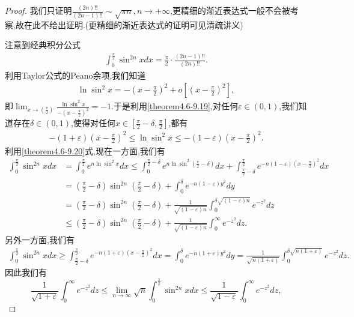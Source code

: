 \documentclass[lang=cn,newtx,10pt,scheme=chinese]{elegantbook}
\begin{document}
\begin{proof}
我们只证明$\frac{(2n)!!}{(2n-1)!!}\sim \sqrt{\pi n},n\rightarrow +\infty$,更精细的渐近表达式一般不会被考察,故在此不给出证明.(更精细的渐近表达式的证明可见清疏讲义)

注意到经典积分公式
\begin{align}\label{theorem4.6-1.1}
\int_{0}^{\frac{\pi}{2}}\sin^{2n}x dx=\frac{\pi}{2}\cdot\frac{(2n - 1)!!}{(2n)!!}.
\end{align}
利用Taylor公式的Peano余项,我们知道
\begin{align}\label{theorem4.6-9.19}
\ln\sin^{2}x=-\left(x - \frac{\pi}{2}\right)^{2}+o\left[\left(x - \frac{\pi}{2}\right)^{2}\right],
\end{align}
即\(\lim_{x\rightarrow(\frac{\pi}{2})}\frac{\ln\sin^{2}x}{-(x - \frac{\pi}{2})^{2}}=-1\).于是利用\eqref{theorem4.6-9.19},对任何\(\varepsilon\in(0,1)\),我们知道存在\(\delta\in(0,1)\),使得对任何\(x\in[\frac{\pi}{2}-\delta,\frac{\pi}{2}]\),都有
\begin{align}\label{theorem4.6-9.20}
-(1 + \varepsilon)\left(x - \frac{\pi}{2}\right)^{2}\leqslant\ln\sin^{2}x\leqslant-(1 - \varepsilon)\left(x - \frac{\pi}{2}\right)^{2}.
\end{align}
利用\eqref{theorem4.6-9.20}式,现在一方面,我们有
\begin{align*}
\int_{0}^{\frac{\pi}{2}}\sin^{2n}x dx&=\int_{0}^{\frac{\pi}{2}}e^{n\ln\sin^{2}x}dx
\leqslant\int_{0}^{\frac{\pi}{2}-\delta}e^{n\ln\sin^{2}(\frac{\pi}{2}-\delta)}dx+\int_{\frac{\pi}{2}-\delta}^{\frac{\pi}{2}}e^{-n(1 - \varepsilon)(x - \frac{\pi}{2})^{2}}dx\\
&=(\frac{\pi}{2}-\delta)\sin^{2n}(\frac{\pi}{2}-\delta)+\int_{0}^{\delta}e^{-n(1 - \varepsilon)y^{2}}dy\\
&=(\frac{\pi}{2}-\delta)\sin^{2n}(\frac{\pi}{2}-\delta)+\frac{1}{\sqrt{(1 - \varepsilon)n}}\int_{0}^{\delta\sqrt{(1 - \varepsilon)n}}e^{-z^{2}}dz\\
&\leqslant(\frac{\pi}{2}-\delta)\sin^{2n}(\frac{\pi}{2}-\delta)+\frac{1}{\sqrt{(1 - \varepsilon)n}}\int_{0}^{\infty}e^{-z^{2}}dz.
\end{align*}
另外一方面,我们有
\begin{align*}
\int_{0}^{\frac{\pi}{2}}\sin^{2n}x dx\geqslant\int_{\frac{\pi}{2}-\delta}^{\frac{\pi}{2}}e^{-n(1 + \varepsilon)(x - \frac{\pi}{2})^{2}}dx
=\int_{0}^{\delta}e^{-n(1 + \varepsilon)y^{2}}dy
=\frac{1}{\sqrt{n(1 + \varepsilon)}}\int_{0}^{\delta\sqrt{n(1 + \varepsilon)}}e^{-z^{2}}dz.
\end{align*}
因此我们有
\[
\frac{1}{\sqrt{1 + \varepsilon}}\int_{0}^{\infty}e^{-z^{2}}dz\leqslant\lim_{n\rightarrow\infty}\sqrt{n}\int_{0}^{\frac{\pi}{2}}\sin^{2n}x dx\leqslant\frac{1}{\sqrt{1 - \varepsilon}}\int_{0}^{\infty}e^{-z^{2}}dz,
\]
\end{proof}
\end{document}
